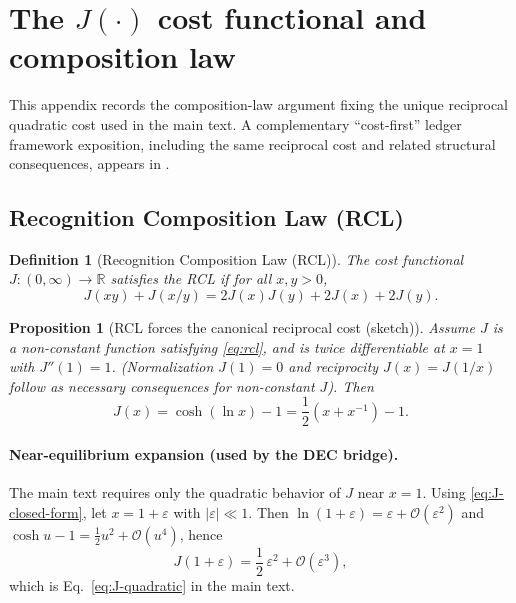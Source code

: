 \documentclass[entropy,article,submit,pdftex,moreauthors]{Definitions/mdpi}
\newcommand{\RR}{\mathbb{R}}
\newtheorem{propositionX}[theoremX]{Proposition}
\newtheorem{definitionX}[theoremX]{Definition}
\begin{document}
\section[\appendixname~\thesection]{The \texorpdfstring{$J(\cdot)$}{J(.)} cost functional and composition law}
\label{app:si-cost}


This appendix records the composition-law argument fixing the unique reciprocal quadratic cost used in the main text. A complementary ``cost-first'' ledger framework exposition, including the same reciprocal cost and related structural consequences, appears in \cite{pardoguerra2026,washburn2026ratio}.

\subsection{Recognition Composition Law (RCL)}
\label{app:rcl}

\begin{definitionX}[Recognition Composition Law (RCL)]
\label{def:rcl}
The cost functional \(J:(0,\infty)\to\RR\) satisfies the RCL if for all \(x,y>0\),
\begin{equation}
  J(xy)+J(x/y)=2J(x)J(y)+2J(x)+2J(y).
  \label{eq:rcl}
\end{equation}
\end{definitionX}

\begin{propositionX}[RCL forces the canonical reciprocal cost (sketch)]
\label{prop:rcl_unique_cost}
Assume \(J\) is a non-constant function satisfying \eqref{eq:rcl}, and is twice differentiable at \(x=1\) with \(J''(1)=1\). (Normalization \(J(1)=0\) and reciprocity \(J(x)=J(1/x)\) follow as necessary consequences for non-constant \(J\)).
Then
\begin{equation}
  J(x)=\cosh(\ln x)-1=\frac12\left(x+x^{-1}\right)-1.
  \label{eq:J-closed-form}
\end{equation}
\end{propositionX}

\paragraph{Near-equilibrium expansion (used by the DEC bridge).}
The main text requires only the quadratic behavior of \(J\) near \(x=1\). Using \eqref{eq:J-closed-form}, let \(x=1+\varepsilon\) with \(|\varepsilon|\ll 1\).
Then \(\ln(1+\varepsilon)=\varepsilon+\mathcal{O}(\varepsilon^2)\) and \(\cosh u-1=\tfrac12u^2+\mathcal{O}(u^4)\), hence
\begin{equation}
  J(1+\varepsilon)=\frac12\,\varepsilon^2+\mathcal{O}(\varepsilon^3),
\end{equation}
which is Eq.~\eqref{eq:J-quadratic} in the main text.
\end{document}
